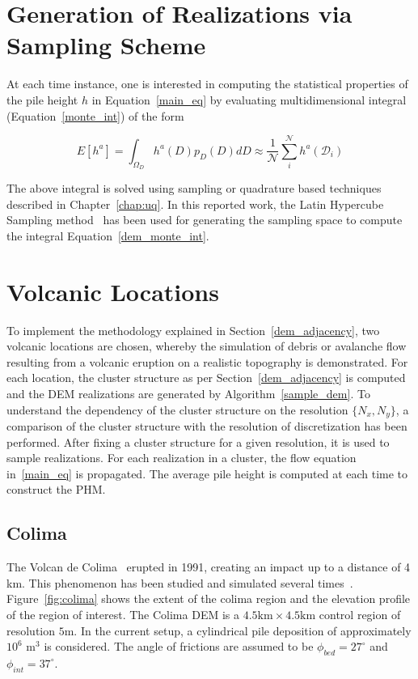 \section{Generation of Realizations via Sampling Scheme}
\label{dem:uncertainty}
At each time instance, one is interested in computing the statistical properties of the pile height $h$ in Equation~\ref{main_eq} by evaluating multidimensional integral (Equation~\ref{monte_int}) of the form

\begin{equation}
\label{dem_monte_int}
E[h^a] = \int_{\Omega_D}  h^a(D) p_{D}(D) dD \approx  \frac{1}{\mathcal{N}}\sum_i^\mathcal{N} h^a(\mathcal{D}_i)
\end{equation}

The above integral is solved using sampling or quadrature based techniques described in Chapter~\ref{chap:uq}. In this reported work, the Latin Hypercube Sampling method~\cite{iman2008latin} has been used for generating the sampling space to compute the integral Equation~\ref{dem_monte_int}.

\section{Volcanic Locations}
\label{volcanic_location}
To implement the methodology explained in Section~\ref{dem_adjacency}, two volcanic locations are chosen, whereby the simulation of debris or avalanche flow resulting from a volcanic eruption on a realistic topography is demonstrated. For each location, the cluster structure as per Section~\ref{dem_adjacency} is computed and the DEM realizations are generated by Algorithm~\ref{sample_dem}. To understand the dependency of the cluster structure on the resolution $\lbrace N_x, N_y \rbrace$, a comparison of the cluster structure with the resolution of discretization has been performed.
After fixing a cluster structure for a given resolution, it is used to sample realizations.
For each realization in a cluster, the flow equation in~\ref{main_eq} is propagated. The average pile height is computed at each time to construct the PHM.

\subsection{Colima}

The Volcan de Colima~\cite{luhr1981colima} erupted in 1991, creating an impact up to a distance of 4 km. This phenomenon has been studied and simulated several times~\cite{rupp2003colima,pitman2003computing,rupp2006colima}. Figure~\ref{fig:colima} shows the extent of the colima region and the elevation profile of the region of interest. The Colima DEM is a $4.5 \text{km} \times 4.5\text{km}$ control region of resolution $5 \text{m}$. In the current setup, a cylindrical pile deposition of approximately $10^6$ $\text{m}^3$ is considered. The angle of frictions are assumed to be $\phi_{bed} = 27^\circ$ and $\phi_{int} = 37^\circ$. 

